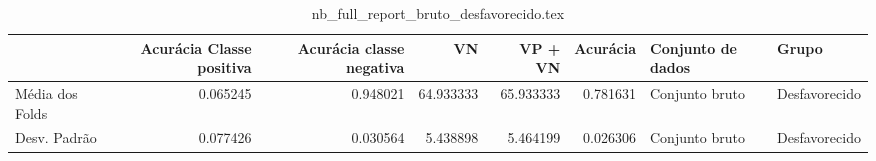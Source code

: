 \begin{table}
\centering
\caption{nb_full_report_bruto_desfavorecido.tex}
\label{nb_full_report_bruto_desfavorecido.tex}
\begin{tabular}{lrrrrrll}
\toprule
{}              &  Acurácia Classe positiva &  Acurácia classe negativa &        VN  &   VP + VN  &  Acurácia & Conjunto de dados &          Grupo \\
\midrule
Média dos Folds &                  0.065245 &                  0.948021 &  64.933333 &  65.933333 &  0.781631 &    Conjunto bruto &  Desfavorecido \\
Desv. Padrão    &                  0.077426 &                  0.030564 &   5.438898 &   5.464199 &  0.026306 &    Conjunto bruto &  Desfavorecido \\
\bottomrule
\end{tabular}
\end{table}
